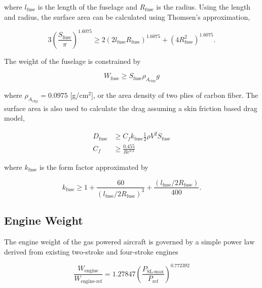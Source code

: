 where $l_{\text{fuse}}$ is the length of the fuselage and $R_{\text{fuse}}$ is the radius. Using the length and radius, the surface area can be calculated using Thomsen's approximation,\cite{ellipsoidSA}

\begin{equation}
    \label{e:fusesa}
    3 \left( \frac{S_{\text{fuse}}}{\pi} \right)^{1.6075} \geq 2(2l_{\text{fuse}}R_{\text{fuse}})^{1.6075} + (4R_{\text{fuse}}^2)^{1.6075}.
\end{equation}

The weight of the fuselage is constrained by

\begin{equation}
    \label{e:fuseweight}
    W_{\text{fuse}} \geq S_{\text{fuse}} \rho_{A_{\text{cfrp}}} g
\end{equation} 

where $\rho_{A_{\text{cfrp}}} = 0.0975$ [g/cm$^2$], or the area density of two plies of carbon fiber.\cite{cfply}  The surface area is also used to calculate the drag assuming a skin friction based drag model,

\begin{align}
    \label{e:fusedrag}
    D_{\text{fuse}} &\geq C_f k_{\text{fuse}} \frac{1}{2} \rho V^2 S_{\text{fuse}} \\
    C_f &\geq \frac{0.455}{Re^{0.3}}
\end{align}

where $k_{\text{fuse}}$ is the form factor approximated by\cite{raymer}

\begin{equation}
    \label{e:fuseform}
    k_{\text{fuse}} \geq 1 + \frac{60}{(l_{\text{fuse}}/2R_{\text{fuse}})^3} + \frac{(l_{\text{fuse}}/2R_{\text{fuse}})}{400}.
\end{equation}

\subsection{Engine Weight}

The engine weight of the gas powered aircraft is governed by a simple power law derived from existing two-stroke and four-stroke engines\cite{gasengine}

\begin{equation}
    \label{e:powerlaw}
    \frac{W_{\text{engine}}}{W_{\text{engine-ref}}} = 1.27847 \left(\frac{P_{\text{SL-max}}}{P_{\text{ref}}} \right)^{0.772392}
\end{equation}

